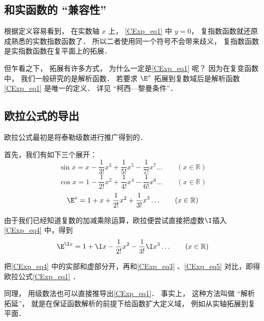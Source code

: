 \subsection{和实函数的 “兼容性”}
根据定义容易看到， 在实数轴 $x$ 上， \autoref{CExp_eq1} 中 $y = 0$， 复指数函数就还原成熟悉的实数指数函数了． 所以二者使用同一个符号不会带来歧义， 复指数函数是实指数函数在复平面上的拓展．

但乍看之下， 拓展有许多方式， 为什么一定是\autoref{CExp_eq1} 呢？ 因为在复变函数中， 我们一般研究的是解析函数． 若要求 $\E^x$ 拓展到复数域后是解析函数\autoref{CExp_eq1} 是唯一的定义． 详见 “柯西—黎曼条件”．

\subsection{欧拉公式的导出}


欧拉公式最初是将泰勒级数进行推广得到的．

首先，我们有如下三个展开：
\begin{equation}\label{CExp_eq3}
\sin x = x - \frac{1}{3!} x^3 + \frac{1}{5!} x^5 - \frac{1}{7!} x^7 \ldots
\qquad (x \in \mathbb R)
\end{equation}
\begin{equation}\label{CExp_eq5}
\cos x = 1 - \frac{1}{2!} x^2 + \frac{1}{4!} x^4 -\frac{1}{6!} x^6 \ldots
\qquad (x \in \mathbb R)
\end{equation}
\begin{equation}
\E^x =1 + x + \frac{1}{2!} x^2 + \frac{1}{3!} x^3  \ldots
\qquad (x \in \mathbb R)
\end{equation}

由于我们已经知道复数的加减乘除运算，欧拉便尝试直接把虚数$\I$插入\autoref{CExp_eq4}  中，得到
\begin{equation}\label{CExp_eq4}
\E^{\I x} =1 + \I x - \frac{1}{2!} x^2 - \frac{1}{3!} \I x^3  \ldots
\qquad (x \in \mathbb R)
\end{equation}

把\autoref{CExp_eq4} 中的实部和虚部分开，再和\autoref{CExp_eq3} 、\autoref{CExp_eq5} 对比，即得欧拉公式\autoref{CExp_eq1} ．

同理， 用级数法也可以直接推导出\autoref{CExp_eq1}． 事实上， 这种方法叫做 “解析拓延”， 就是在保证函数解析的前提下给函数扩大定义域， 例如从实轴拓展到复平面．
